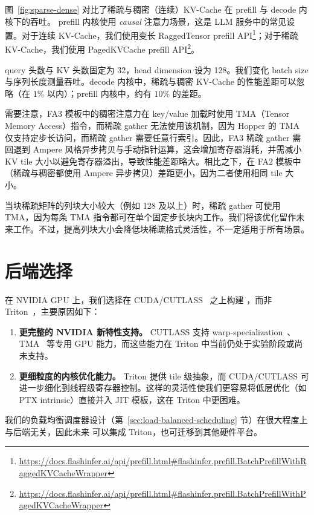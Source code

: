 图~\ref{fig:sparse-dense} 对比了稀疏与稠密（连续）KV-Cache 在 prefill 与 decode 内核下的吞吐。
prefill 内核使用 \textit{causal} 注意力场景，这是 LLM 服务中的常见设置。对于连续 KV-Cache，我们使用变长 RaggedTensor prefill API\footnote{\url{https://docs.flashinfer.ai/api/prefill.html\#flashinfer.prefill.BatchPrefillWithRaggedKVCacheWrapper}}；对于稀疏 KV-Cache，我们使用 PagedKVCache prefill API\footnote{\url{https://docs.flashinfer.ai/api/prefill.html\#flashinfer.prefill.BatchPrefillWithPagedKVCacheWrapper}}。

query 头数与 KV 头数固定为 32，head dimension 设为 128。我们变化 batch size 与序列长度测量吞吐。decode 内核中，稀疏与稠密 KV-Cache 的性能差距可以忽略（在 $1\%$ 以内）；prefill 内核中，约有 $10\%$ 的差距。

需要注意，FA3 模板中的稠密注意力在 key/value 加载时使用 TMA（Tensor Memory Access）指令，而稀疏 gather 无法使用该机制，因为 Hopper 的 TMA 仅支持定步长访问，而稀疏 gather 需要任意行索引。因此，FA3 稀疏 gather 需回退到 Ampere 风格异步拷贝与手动指针运算，这会增加寄存器消耗，并需减小 KV tile 大小以避免寄存器溢出，导致性能差距略大。相比之下，在 FA2 模板中（稀疏与稠密都使用 Ampere 异步拷贝）差距更小，因为二者使用相同 tile 大小。

当块稀疏矩阵的列块大小较大（例如 128 及以上）时，稀疏 gather 可使用 TMA，因为每条 TMA 指令都可在单个固定步长块内工作。我们将该优化留作未来工作。不过，提高列块大小会降低块稀疏格式灵活性，不一定适用于所有场景。

\section{后端选择}
\label{sec:backend-choice}

在 NVIDIA GPU 上，我们选择在 CUDA/CUTLASS~\cite{cutlass} 之上构建 \sys，而非 Triton~\cite{triton}，主要原因如下：
\begin{enumerate}
    \item \textbf{更完整的 NVIDIA 新特性支持。} CUTLASS 支持 warp-specialization~\cite{warp-specialization}、TMA~\cite{hopper-tma} 等专用 GPU 能力，而这些能力在 Triton 中当前仍处于实验阶段或尚未支持。
    \item \textbf{更细粒度的内核优化能力。} Triton 提供 tile 级抽象，而 CUDA/CUTLASS 可进一步细化到线程级寄存器控制。这样的灵活性使我们更容易将低层优化（如 PTX intrinsic）直接并入 JIT 模板，这在 Triton 中更困难。
\end{enumerate}

我们的负载均衡调度器设计（第~\ref{sec:load-balanced-scheduling} 节）在很大程度上与后端无关，因此未来 \sys 可以集成 Triton，也可迁移到其他硬件平台。

